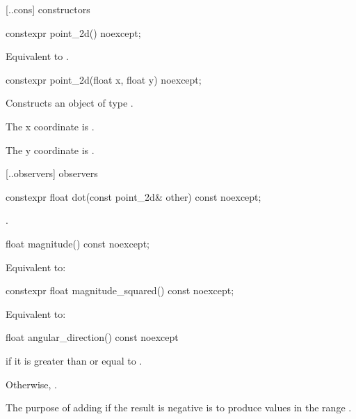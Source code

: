  [\iotwod.\pointtwod.cons] { constructors}

%
\begin{itemdecl}
constexpr point_2d() noexcept;
\end{itemdecl}
\begin{itemdescr}
\pnum
\effects
Equivalent to .
\end{itemdescr}

%
\begin{itemdecl}
constexpr point_2d(float x, float y) noexcept;
\end{itemdecl}
\begin{itemdescr}
\pnum
\effects
Constructs an object of type .

\pnum
The x coordinate is .

\pnum
The y coordinate is .
\end{itemdescr}

 [\iotwod.\pointtwod.observers]{ observers}

%
\begin{itemdecl}
constexpr float dot(const point_2d& other) const noexcept;
\end{itemdecl}
\begin{itemdescr}
\pnum
\returns
{}.
\end{itemdescr}

%
\begin{itemdecl}
float magnitude() const noexcept;
\end{itemdecl}
\begin{itemdescr}
\pnum
\returns
Equivalent to: 
\end{itemdescr}

%
\begin{itemdecl}
constexpr float magnitude_squared() const noexcept;
\end{itemdecl}
\begin{itemdescr}
\pnum
\returns
Equivalent to: 
\end{itemdescr}

%
\begin{itemdecl}
float angular_direction() const noexcept
\end{itemdecl}
\begin{itemdescr}
\pnum
\returns
{} if it is greater than or equal to .

\pnum
Otherwise, . 

\pnum
\begin{note}
The purpose of adding  if the result is negative is to produce values in the range .
\end{note}
\end{itemdescr}

